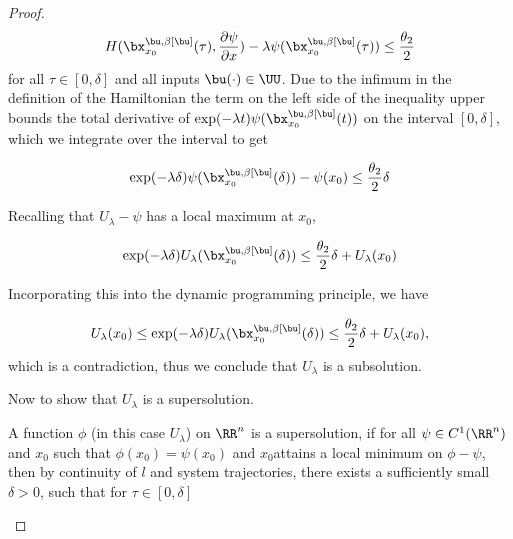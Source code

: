 \begin{for_journal}
\begin{proof}
\begin{equation}
H(\bx_{x_0}^{\bu,\beta[\bu]}(\tau), \frac{\partial \psi}{\partial x}) - \lambda \psi(\bx_{x_0}^{\bu,\beta[\bu]}(\tau)) \leq \frac{\theta_2}{2}
\end{equation}%
\noindent for all $\tau \in [0,\delta]$ and all inputs $\bu(\cdot) \in \UU$. Due to the infimum in the definition of the Hamiltonian the term on the left side of the inequality upper bounds the total derivative of $\exp(-\lambda t)\psi(\bx_{x_0}^{\bu,\beta[\bu]}(t))$ on the interval $[0,\delta]$,  which we integrate over the interval to get



\begin{equation}
\exp(-\lambda \delta)\psi(\bx_{x_0}^{\bu,\beta[\bu]}(\delta))-\psi(x_0) \leq \frac{\theta_2}{2} \delta
\end{equation}

Recalling that $U_{\lambda}-\psi$ has a local maximum at $x_0$,

\begin{equation}
\exp(-\lambda \delta)U_{\lambda}(\bx_{x_0}^{\bu,\beta[\bu]}(\delta)) \leq \frac{\theta_2}{2} \delta + U_{\lambda}(x_0)
\end{equation}

Incorporating this into the dynamic programming principle, we have

\begin{equation}
U_{\lambda}(x_0) \leq \exp(-\lambda \delta)U_{\lambda}(\bx_{x_0}^{\bu,\beta[\bu]}(\delta)) \leq \frac{\theta_2}{2} \delta + U_{\lambda}(x_0),
\end{equation}%
\noindent which is a contradiction, thus we conclude that $U_{\lambda}$ is a subsolution.


Now to show that $U_{\lambda}$ is a supersolution. 

\begin{definition} A function $\phi$ (in this case $U_{\lambda}$) on $\RR^n$  is a supersolution, if for all $\psi \in C^1(\RR^n)$ and $x_0$ such that $\phi(x_0) = \psi(x_0)$ and $x_0$attains a local minimum on $\phi- \psi$, then by continuity of $l$ and system trajectories, there exists a sufficiently small $\delta>0$, such that for $\tau \in [0, \delta]$


\end{definition}
\end{proof}
\end{for_journal}
